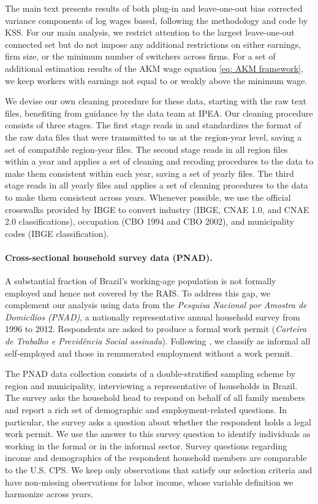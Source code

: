 The main text presents results of both plug-in and leave-one-out bias corrected variance components of log wages based, following the methodology and code by KSS. For our main analysis, we restrict attention to the largest leave-one-out connected set but do not impose any additional restrictions on either earnings, firm size, or the minimum number of switchers across firms. For a set of additional estimation results of the AKM wage equation \eqref{eq: AKM framework}, we keep workers with earnings not equal to or weakly above the minimum wage.

We devise our own cleaning procedure for these data, starting with
the raw text files, benefiting from guidance by the data team at IPEA.
Our cleaning procedure consists of three stages. The first stage reads
in and standardizes the format of the raw data files that were transmitted
to us at the region-year level, saving a set of compatible region-year
files. The second stage reads in all region files within a year and
applies a set of cleaning and recoding procedures to the data to make
them consistent within each year, saving a set of yearly files. The
third stage reads in all yearly files and applies a set of cleaning
procedures to the data to make them consistent across years. Whenever
possible, we use the official crosswalks provided by IBGE to convert
industry (IBGE, CNAE 1.0, and CNAE 2.0 classifications), occupation
(CBO 1994 and CBO 2002), and municipality codes (IBGE classification).


\paragraph{Cross-sectional household survey data (PNAD).}

A substantial fraction of Brazil's working-age population is not formally
employed and hence not covered by the RAIS. To address this gap, we
complement our analysis using data from the \emph{Pesquisa Nacional
por Amostra de Domic\'{i}lios (PNAD)}, a nationally representative
annual household survey from 1996 to 2012. Respondents are asked to produce a formal
work permit (\emph{Carteira de Trabalho e Previd\^{e}ncia Social
assinada}). Following , we classify as informal
all self-employed and those in remunerated employment without a work
permit.

The PNAD data collection consists of a double-stratified sampling
scheme by region and municipality, interviewing a representative of
households in Brazil. The survey asks the household head to respond
on behalf of all family members and report a rich set of demographic
and employment-related questions. In particular, the survey asks a
question about whether the respondent holds a legal work permit. We
use the answer to this survey question to identify individuals as
working in the formal or in the informal sector. Survey questions
regarding income and demographics of the respondent household members
are comparable to the U.S. CPS. We
keep only observations that satisfy our selection criteria and have
non-missing observations for labor income, whose variable definition
we harmonize across years.


